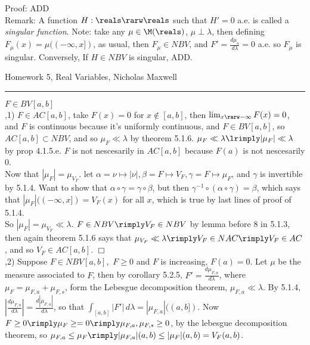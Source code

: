 \noindent
Proof: ADD \\

Remark: A function $H: \reals \rarw \reals$ such that $H'=0$ a.e. is called a \emph{singular function}. Note: take any $\mu \in \M(\reals)$, $\mu \perp \lambda$, then defining $F_\mu(x) = \mu((-\infty,x])$, as usual, then $F_\mu \in NBV$, and $F' = \frac{d\mu_a}{d\lambda} = 0$ a.e. so $F_\mu$ is singular. Conversely, If $H \in NBV$ is singular,  ADD.


\break


\begin{flushleft}
Homework 5, Real Variables, Nicholas Maxwell\\
\end{flushleft}

\begin{flushleft}
\addvspace{5pt} \hrule
\end{flushleft}	


$F \in BV[a,b]$ \\

,1) $F \in AC[a,b]$, take $F(x) = 0$ for $x \not \in [a,b]$, then $\lim_{x \rarw - \infty} F(x) = 0$, and $F$ is continuous because it's uniformly continuous, and $F \in BV[a,b]$, so $AC[a,b] \subset NBV$, and so $\mu_F \ll \lambda$ by theorem 5.1.6. $\mu_F \ll \lambda \lrimply |\mu_F| \ll \lambda$ by prop 4.1.5.e. $F$ is not nescesarily in $AC[a,b]$ because $F(a)$ is not nescesarily 0. \\

\noindent
Now that $|\mu_F| = \mu_{V_F}$. let $\alpha = \nu \mapsto |\nu|, \beta = F \mapsto V_F, \gamma = F \mapsto \mu_F$, and $\gamma$ is invertible by 5.1.4. Want to show that $\alpha \circ \gamma = \gamma \circ \beta$, but then $ \gamma^{-1} \circ ( \alpha \circ \gamma) = \beta$, which says that $|\mu_F|((-\infty,x]) = V_F(x)$ for all $x$, which is true by last lines of proof of 5.1.4.\\


So $|\mu_F| = \mu_{V_F} \ll \lambda$. $F \in NBV \rimply V_F \in NBV$  by lemma before 8 in 5.1.3, then again theorem 5.1.6 says that $\mu_{V_F} \ll \lambda \rimply  V_F \in NAC \rimply V_F \in AC$, and so $V_F \in AC[a,b]$. $\Box$ \\

,2) Suppose $F \in NBV[a,b],$ $F \ge 0$ and $F$ is increasing, $F(a)=0$. Let $\mu$ be the measure associated to $F$, then by corollary 5.2.5, $F' = \frac{d \mu_{F,a}}{d \lambda}$, where $\mu_{F} = \mu_{F,a} + \mu_{F,s}$, form the Lebesgue decomposition theorem, $\mu_{F,a} \ll \lambda$. By 5.1.4, $|\frac{d \mu_{F,a}}{d \lambda}| = \frac{d |\mu_{F,a}|}{d \lambda}$, so that $\int_{[a,b]} |F'| \, d\lambda = |\mu_{F,a}|((a,b])$. Now $F \ge 0 \rimply \mu_F \ge = 0 \rimply \mu_{F,a},\mu_{F,s} \ge 0$, by the lebesgue decomposition theorem, so $\mu_{F,a} \le \mu_F \rimply |\mu_{F,a}|(a,b) \le |\mu_F |(a,b)  = V_F(a,b)$. \\

